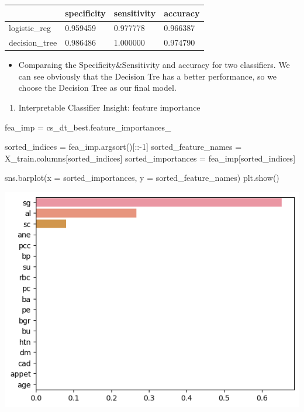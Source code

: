 \documentclass[
  11pt,
  letterpaper,
  DIV=11,
  numbers=noendperiod]{scrartcl}
\newenvironment{Shaded}{\begin{snugshade}}{\end{snugshade}}
\newcommand{\DecValTok}[1]{\textcolor[rgb]{0.68,0.00,0.00}{#1}}
\newcommand{\NormalTok}[1]{\textcolor[rgb]{0.00,0.23,0.31}{#1}}
\newcommand{\OperatorTok}[1]{\textcolor[rgb]{0.37,0.37,0.37}{#1}}
\providecommand{\tightlist}{%
  \setlength{\itemsep}{0pt}\setlength{\parskip}{0pt}}\usepackage{longtable,booktabs,array}
\begin{document}
\begin{longtable}[]{@{}llll@{}}
\toprule\noalign{}
& specificity & sensitivity & accuracy \\
\midrule\noalign{}
\endhead
\bottomrule\noalign{}
\endlastfoot
logistic\_reg & 0.959459 & 0.977778 & 0.966387 \\
decision\_tree & 0.986486 & 1.000000 & 0.974790 \\
\end{longtable}

\begin{itemize}
\tightlist
\item
  Comparaing the Specificity\&Sensitivity and accuracy for two
  classifiers. We can see obviously that the Decision Tre has a better
  performance, so we choose the Decision Tree as our final model.
\end{itemize}

\begin{enumerate}
\def\labelenumi{\arabic{enumi}.}
\setcounter{enumi}{12}
\tightlist
\item
  Interpretable Classifier Insight: feature importance
\end{enumerate}

\begin{Shaded}
\begin{Highlighting}[]
\NormalTok{fea\_imp }\OperatorTok{=}\NormalTok{ cs\_dt\_best.feature\_importances\_}

\NormalTok{sorted\_indices }\OperatorTok{=}\NormalTok{ fea\_imp.argsort()[::}\OperatorTok{{-}}\DecValTok{1}\NormalTok{]}
\NormalTok{sorted\_feature\_names }\OperatorTok{=}\NormalTok{ X\_train.columns[sorted\_indices]}
\NormalTok{sorted\_importances }\OperatorTok{=}\NormalTok{ fea\_imp[sorted\_indices]}

\NormalTok{sns.barplot(x }\OperatorTok{=}\NormalTok{ sorted\_importances, y }\OperatorTok{=}\NormalTok{ sorted\_feature\_names)}
\NormalTok{plt.show()}
\end{Highlighting}
\end{Shaded}

\includegraphics{assignment6111_files/figure-pdf/cell-74-output-1.png}
\end{document}
